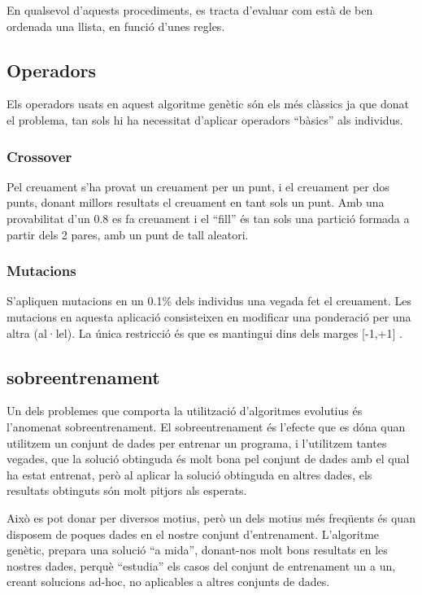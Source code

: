 \documentclass[titlepage,a4paper,12pt]{book}
\begin{document}
En qualsevol d'aquests procediments, es tracta d'evaluar com està de ben ordenada una llista, en
funció d'unes regles.

\subsection{Operadors} %
\label{sub:Operadors}

Els operadors usats en aquest algoritme genètic són els més clàssics ja que donat el problema, tan
sols hi ha necessitat d'aplicar operadors ``bàsics'' als individus.  

\subsubsection{Crossover} %
\label{ssub:Crossover}
Pel creuament s'ha provat un creuament per un punt, i el creuament per dos punts, donant millors
resultats el creuament en tant sols un punt.  Amb una provabilitat d'un 0.8 es fa creuament i el
``fill'' és tan sols una partició formada a partir dels 2 pares, amb un punt de tall aleatori.

\subsubsection{Mutacions} %
\label{ssub:Mutacions}

S'apliquen mutacions en un 0.1\% dels individus una vegada fet el creuament.  Les mutacions en
aquesta aplicació consisteixen en modificar una ponderació per una altra (al·lel).  La única
restricció és que es mantingui dins dels marges [-1,+1] .

\subsection{sobreentrenament} %
\label{sub:sobreentrenament}

Un dels problemes que comporta la utilització d'algoritmes evolutius és
l'anomenat sobreentrenament.  El sobreentrenament és l'efecte que es dóna quan
utilitzem un conjunt de dades per entrenar un programa, i l'utilitzem tantes
vegades, que la solució obtinguda és molt bona pel conjunt de dades amb el qual
ha estat entrenat, però al aplicar la solució obtinguda en altres dades, els
resultats obtinguts són molt pitjors als esperats.

Això es pot donar per diversos motius, però un dels motius més freqüents és quan
disposem de poques dades en el nostre conjunt d'entrenament.  L'algoritme
genètic, prepara una solució ``a mida'', donant-nos molt bons resultats en les
nostres dades, perquè ``estudia'' els casos del conjunt de entrenament un a un,
creant solucions ad-hoc, no aplicables a altres conjunts de dades.
\end{document}

